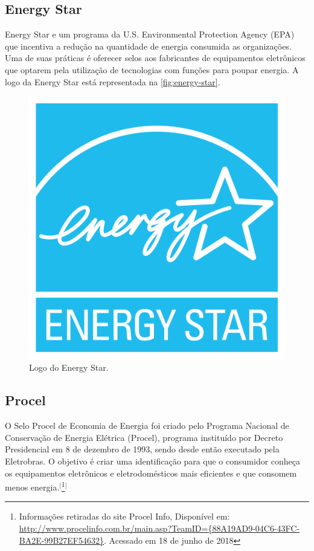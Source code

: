 \subsection{Energy Star}

Energy Star e um programa da U.S. Environmental Protection Agency (EPA) que incentiva a redução na quantidade de energia consumida as organizações. Uma de suas práticas é oferecer selos aos fabricantes de equipamentos eletrônicos que optarem pela utilização de tecnologias com funções para poupar energia. A logo da Energy Star está representada na \autoref{fig:energy-star}. 

\begin{figure}[htb]
	\caption{\label{fig:energy-star}Logo do Energy Star.}
	\begin{center}
	    \includegraphics[scale=0.1]{imagens/energy-star.png}
	\end{center}
\end{figure}

\subsection{Procel}

O Selo Procel de Economia de Energia foi criado pelo Programa Nacional de Conservação de Energia Elétrica (Procel), programa instituído por Decreto Presidencial em 8 de dezembro de 1993, sendo desde então executado pela Eletrobras. O objetivo é criar uma identificação para que o consumidor conheça os equipamentos eletrônicos e eletrodomésticos mais eficientes e que consomem menos energia.$^{[}$\footnote{Informações retiradas do site Procel Info, Disponível em: \url{http://www.procelinfo.com.br/main.asp?TeamID={88A19AD9-04C6-43FC-BA2E-99B27EF54632}}. Acessado em 18 de junho de 2018}$^{]}$

